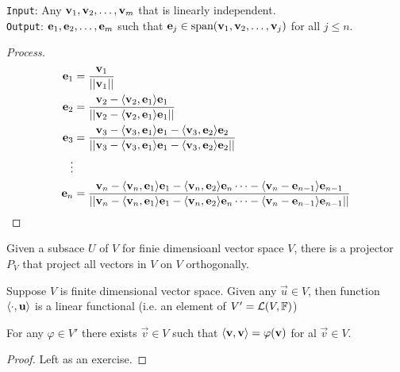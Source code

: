 \begin{algorithm}
    \texttt{Input}: Any ${\mathbf v}_1,{\mathbf v}_2, \ldots, {\mathbf v}_{m}$ that is linearly independent. \\
    \texttt{Output}: ${\mathbf e}_1,{\mathbf e}_2, \ldots, {\mathbf e}_{m}$ such that $\mathbf e_j \in \text{span} ({\mathbf v}_1,{\mathbf v}_2, \ldots, {\mathbf v}_{j})$ for all $j \leq n$.
    \begin{proof}[Process] $ $
        \begin{align*}\mathbf e_1 &= \frac{\mathbf v_1}{||\mathbf v_1||} \\
        \mathbf e_2 &= \frac{\mathbf v_2 - \langle \mathbf v_2, \mathbf e_1 \rangle \mathbf e_1}{||\mathbf v_2 - \langle \mathbf v_2, \mathbf e_1 \rangle \mathbf e_1||} \\
        \mathbf e_3 &= \frac{\mathbf v_3 - \langle \mathbf v_3, \mathbf e_1 \rangle \mathbf e_1 - \langle \mathbf v_3, \mathbf e_2 \rangle \mathbf e_2}{||\mathbf v_3 - \langle \mathbf v_3, \mathbf e_1 \rangle \mathbf e_1 - \langle \mathbf v_3, \mathbf e_2 \rangle \mathbf e_2||} \\
        \vdots \\
        \mathbf e_n &= \frac{\mathbf v_n - \langle \mathbf v_{n}, \mathbf e_1 \rangle \mathbf e_1 - \langle \mathbf v_n, \mathbf e_2 \rangle \mathbf e_n \cdots - \langle \mathbf v_n - \mathbf e_{n-1} \rangle \mathbf e_{n-1}}{||\mathbf v_n - \langle \mathbf v_{n}, \mathbf e_1 \rangle \mathbf e_1 - \langle \mathbf v_n, \mathbf e_2 \rangle \mathbf e_n \cdots - \langle \mathbf v_n - \mathbf e_{n-1} \rangle \mathbf e_{n-1}||}
        \end{align*}
    \end{proof}
\end{algorithm}
\begin{remark}
    Given a subsace $U$ of $V$ for finie dimensioanl vector space $V$, there is a projector $P_V$ that project all vectors in $V$ on $V$ orthogonally.
\end{remark}
\begin{remark}
    Suppose $V$ is finite dimensional vector space. Given any $\vec u \in V$, then function $\langle \cdot, \mathbf u\rangle$ is a linear functional (i.e. an element of $V' = \mathcal L(V,\mathbb F)$)
\end{remark}
\begin{theorem}
    For any $\varphi \in V'$ there exists $\vec v \in V$ such that $\langle \mathbf v, \mathbf v \rangle = \varphi (\mathbf v)$ for al $\vec v \in V$.
\end{theorem}
\begin{proof}
    Left as an exercise.
\end{proof}